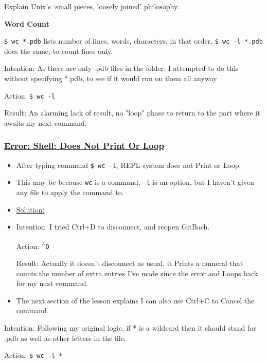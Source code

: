 \documentclass[12pt]{article}
\begin{document}
Explain Unix’s ‘small pieces, loosely joined’ philosophy.

\color{black}

\vspace{1em}
\textbf{Word Count}

\texttt{\$ wc *.pdb} lists number of lines, words, characters, in that order. \texttt{\$ wc -l *.pdb} does the same, to count lines only.


Intention: As there are only .pdb files in the folder, I attempted to do this without specifying *.pdb, to see if it would run on them all anyway

Action: \texttt{\$ wc -l}

Result: An alarming lack of result, no "loop" phase to return to the part where it awaits my next command.

\subsubsection{\texorpdfstring{\underline{Error: Shell: Does Not Print Or Loop}}{}}\label{error:er16}
\begin{itemize}
    \item After typing command \texttt{\$ wc -l}, REPL system does not Print or Loop. 
    \item This may be because \texttt{wc} is a command, \texttt{-l} is an option, but I haven't given any file to apply the command to.
\end{itemize}
\begin{itemize}
\renewcommand{\labelitemi}{}
\item \underline{Solution:}
\renewcommand{\labelitemi}{$\bullet$}
    \item Intention: I tried Ctrl+D to disconnect, and reopen GitBash.
    
    Action: \texttt{\textsuperscript{$\wedge$}D}
    
    Result: Actually it doesn't disconnect as usual, it Prints a numeral that counts the number of extra entries I've made since the error and Loops back for my next command.
    
    \item The next section of the lesson explains I can also use Ctrl+C to Cancel the command.
\end{itemize}

Intention: Following my original logic, if * is a wildcard then it should stand for .pdb as well as other letters in the file. 

Action: \texttt{\$ wc -l *}
\end{document}
